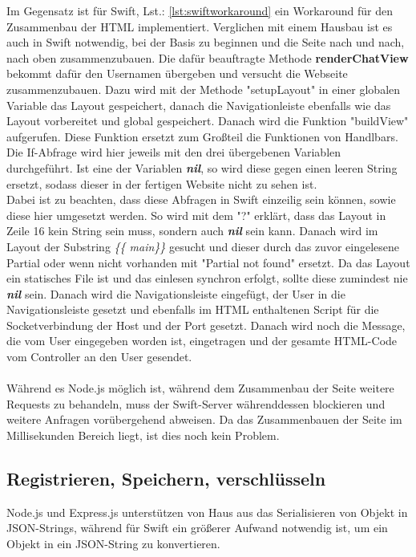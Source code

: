 Im Gegensatz ist für Swift, Lst.: \ref{lst:swiftworkaround} ein Workaround für den Zusammenbau der HTML implementiert. Verglichen mit einem Hausbau ist es auch in Swift notwendig, bei der Basis zu beginnen und die Seite nach und nach, nach oben zusammenzubauen. Die dafür beauftragte Methode \textbf{renderChatView} bekommt dafür den Usernamen übergeben und versucht die Webseite zusammenzubauen. Dazu wird mit der Methode "setupLayout" in einer globalen Variable das Layout gespeichert, danach die Navigationleiste ebenfalls wie das Layout vorbereitet und global gespeichert. Danach wird die Funktion "buildView" aufgerufen. Diese Funktion ersetzt zum Großteil die Funktionen von Handlbars. Die If-Abfrage wird hier jeweils mit den drei übergebenen Variablen durchgeführt. Ist eine der Variablen \textit{\textbf{nil}}, so wird diese gegen einen leeren String ersetzt, sodass dieser in der fertigen Website nicht zu sehen ist. \\
Dabei ist zu beachten, dass diese Abfragen in Swift einzeilig sein können, sowie diese hier umgesetzt werden. So wird mit dem "?" erklärt, dass das Layout in Zeile 16 kein String sein muss, sondern auch \textit{\textbf{nil}} sein kann. Danach wird im Layout der Substring \textit{\{\{ main\}\}} gesucht und dieser durch das zuvor eingelesene Partial oder wenn nicht vorhanden mit "Partial not found" ersetzt. Da das Layout ein statisches File ist und das einlesen synchron erfolgt, sollte diese zumindest nie \textit{\textbf{nil}} sein. Danach wird die Navigationsleiste eingefügt, der User in die Navigationsleiste gesetzt und ebenfalls im HTML enthaltenen Script für die Socketverbindung der Host und der Port gesetzt. Danach wird noch die Message, die vom User eingegeben worden ist, eingetragen und der gesamte HTML-Code vom Controller an den User gesendet. 
\\\\
Während es Node.js möglich ist, während dem Zusammenbau der Seite weitere Requests zu behandeln, muss der Swift-Server währenddessen blockieren und weitere Anfragen vorübergehend abweisen. Da das Zusammenbauen der Seite im Millisekunden Bereich liegt, ist dies noch kein Problem.


\subsection{Registrieren, Speichern, verschlüsseln}
Node.js und Express.js unterstützen von Haus aus das Serialisieren von Objekt in JSON-Strings, während für Swift ein größerer Aufwand notwendig ist, um ein Objekt in ein JSON-String zu konvertieren.


